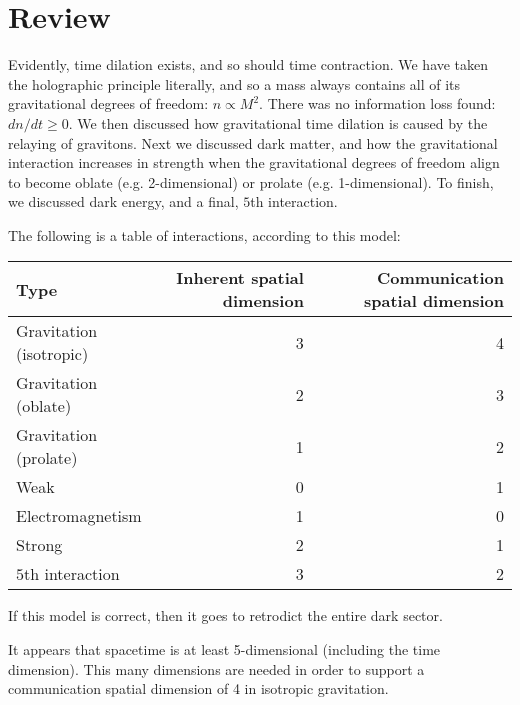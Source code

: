 \documentclass[12pt]{article}
\begin{document}
\section{Review}

Evidently, time dilation exists, and so should time contraction.
We have taken the holographic principle literally, and so a mass always contains all of its gravitational degrees of freedom: $n \propto M^2$.
There was no information loss found: $dn/dt \geq 0$.
We then discussed how gravitational time dilation is caused by the relaying of gravitons.
Next we discussed dark matter, and how the gravitational interaction increases in strength when the gravitational degrees of freedom align to become oblate (e.g. 2-dimensional) or prolate (e.g. 1-dimensional).
To finish, we discussed dark energy, and a final, $5$th interaction. 

The following is a table of interactions, according to this model:
\begin{center}
\begin{tabular}{| l | r | r |}
  \hline
  Type & Inherent spatial dimension & Communication spatial dimension \\
\hline
\hline
Gravitation (isotropic) & 3  & 4\\
Gravitation (oblate) & 2 & 3\\
Gravitation (prolate) & 1 & 2\\
Weak & 0 & 1\\
Electromagnetism & 1 & 0 \\
Strong & 2 & 1\\
$5$th interaction & 3 & 2 \\
  \hline  
\end{tabular}
\end{center}

If this model is correct, then it goes to retrodict the entire dark sector.

It appears that spacetime is at least 5-dimensional (including the time dimension).
This many dimensions are needed in order to support a communication spatial dimension of 4 in isotropic gravitation.






\pagebreak
\end{document}
